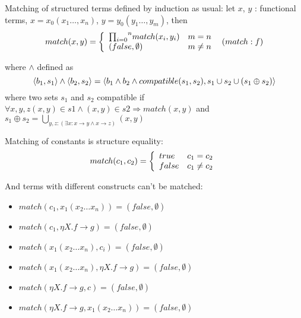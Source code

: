 \documentclass[10pt]{article}
\begin{document}
     Matching of structured terms defined by induction as usual:
      let $x$, $y$ : functional terms, $x=x_0(x_1\dots,x_n)$, 
      $y=y_0(y_1\dots,y_m)$, then
      $${
        match(x,y) = \left\{
       \begin{array}{l l}
        {\prod_{i=0}}^n match(x_i,y_i) & m = n \\
        (false,\emptyset) &   m \neq n \\
       \end{array}
      \right.
        }\,\,\,\,{(match:f)}
      $$ 

    where $\land$ defined as 
    $$\langle b_1, s_1\rangle \land \langle b_2, s_2\rangle
       =
    \langle b_1\land b_2\land compatible(s_1,s_2), s_{1}\cup s_2 \cup (s_1\oplus s_2)
                                                                                  \rangle \\
    $$
    where two sets $s_1$ and $s_2$ compatible if 
     $\forall x,y,z (x,y)\in s1 \land (x,y)\in s2 \Rightarrow match(x,y)$ 
    and 
     $s_1\oplus s_2 = \bigcup_{{y,z}:(\exists x:x\to y \land x\to z)}(x,y)$ 
      
    Matching of constants is structure equality:
    $$
     match(c_1,c_2)=\left\{
      \begin{array}{ l l }
        true  &  c_1=c_2  \\
        false &  c_1\not=c_2        
      \end{array}
     \right.
    $$  

    And terms with different constructs can't be matched:
  \begin{itemize}
   \item $match(c_1,x_1(x_2\dots x_n))=(false,\emptyset)$
   \item $match(c_1,\eta X. f\to g )=(false,\emptyset)$
   \item $match(x_1(x_2\dots x_n),c_i)=(false,\emptyset)$
   \item $match(x_1(x_2\dots x_n),\eta X. f\to g)=(false,\emptyset)$
   \item $match(\eta X. f\to g, c)=(false,\emptyset)$
   \item $match(\eta X. f\to g, x_1(x_2\dots x_n))=(false,\emptyset)$
  \end{itemize}  
     
\end{document}
